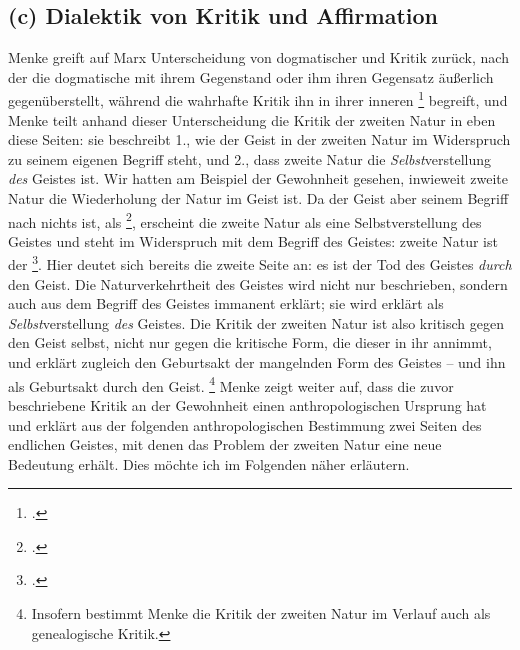 \documentclass[12pt, a4paper, openany]{report}
\begin{document}
\subsection{(c) Dialektik von Kritik und Affirmation}\label{kritik_affirmation}
Menke greift auf Marx Unterscheidung von dogmatischer und  Kritik zurück, nach der die dogmatische mit ihrem Gegenstand  oder ihm ihren Gegensatz äußerlich gegenüberstellt, während die wahrhafte Kritik ihn in ihrer inneren \footcite[][296]{marx_kritik_1977} begreift, und Menke teilt anhand dieser Unterscheidung die Kritik der zweiten Natur in eben diese Seiten:
sie beschreibt 1., wie der Geist in der zweiten Natur im Widerspruch zu seinem eigenen Begriff steht, und 2., dass zweite Natur die \emph{Selbst}verstellung \emph{des} Geistes ist.
Wir hatten am Beispiel der Gewohnheit gesehen, inwieweit zweite Natur die Wiederholung der Natur im Geist ist. 
Da der Geist aber seinem Begriff nach nichts ist, als \footcite[][137]{menke_autonomie_2018}, erscheint die zweite Natur als eine Selbstverstellung des Geistes und steht im Widerspruch mit dem Begriff des Geistes:
zweite Natur ist der \footcite[][43]{menke_autonomie_2018}.
Hier deutet sich bereits die zweite Seite an:
es ist der Tod des Geistes \emph{durch} den Geist.
Die Naturverkehrtheit des Geistes wird nicht nur beschrieben, sondern auch aus dem Begriff des Geistes immanent erklärt;
sie wird erklärt als \emph{Selbst}verstellung \emph{des} Geistes. 
Die Kritik der zweiten Natur ist also kritisch gegen den Geist selbst, nicht nur gegen die kritische Form, die dieser in ihr annimmt, und erklärt zugleich den Geburtsakt der mangelnden Form des Geistes -- und ihn als Geburtsakt durch den Geist.%
\footnote{
    Insofern bestimmt Menke die Kritik der zweiten Natur im Verlauf auch als genealogische Kritik.
}
Menke zeigt weiter auf, dass die zuvor beschriebene Kritik an der Gewohnheit einen anthropologischen Ursprung hat und erklärt aus der folgenden anthropologischen Bestimmung zwei Seiten des endlichen Geistes, mit denen das Problem der zweiten Natur eine neue Bedeutung erhält.
Dies möchte ich im Folgenden näher erläutern.\\
\end{document}
